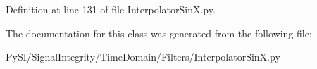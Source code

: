 Definition at line 131 of file Interpolator\+Sin\+X.\+py.



The documentation for this class was generated from the following file\+:\begin{DoxyCompactItemize}
\item 
Py\+S\+I/\+Signal\+Integrity/\+Time\+Domain/\+Filters/Interpolator\+Sin\+X.\+py\end{DoxyCompactItemize}
